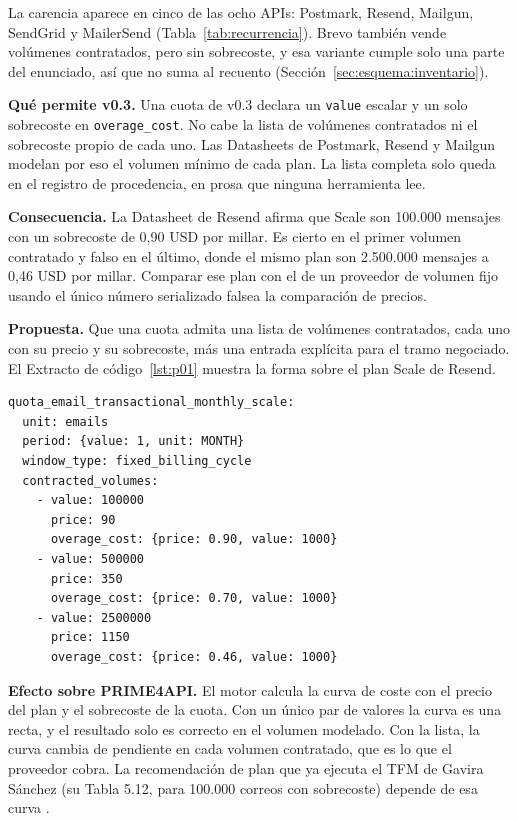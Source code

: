 La carencia aparece en cinco de las ocho APIs: Postmark, Resend, Mailgun, SendGrid y MailerSend (Tabla~\ref{tab:recurrencia}).
Brevo también vende volúmenes contratados, pero sin sobrecoste, y esa variante cumple solo una parte del enunciado, así que no suma al recuento (Sección~\ref{sec:esquema:inventario}).

\textbf{Qué permite v0.3.} Una cuota de v0.3 declara un \texttt{value} escalar y un solo sobrecoste en \texttt{overage\_cost}.
No cabe la lista de volúmenes contratados ni el sobrecoste propio de cada uno.
Las Datasheets de Postmark, Resend y Mailgun modelan por eso el volumen mínimo de cada plan.
La lista completa solo queda en el registro de procedencia, en prosa que ninguna herramienta lee.

\textbf{Consecuencia.} La Datasheet de Resend afirma que Scale son 100.000 mensajes con un sobrecoste de 0,90 USD por millar.
Es cierto en el primer volumen contratado y falso en el último, donde el mismo plan son 2.500.000 mensajes a 0,46 USD por millar.
Comparar ese plan con el de un proveedor de volumen fijo usando el único número serializado falsea la comparación de precios.

\textbf{Propuesta.} Que una cuota admita una lista de volúmenes contratados, cada uno con su precio y su sobrecoste, más una entrada explícita para el tramo negociado.
El Extracto de código~\ref{lst:p01} muestra la forma sobre el plan Scale de Resend.

\begin{lstlisting}[style=datasheetyaml,caption={P-01: volúmenes contratados dentro de un plan, con precio y sobrecoste propios (caso Resend, plan Scale, tres de los seis volúmenes).},label={lst:p01}]
quota_email_transactional_monthly_scale:
  unit: emails
  period: {value: 1, unit: MONTH}
  window_type: fixed_billing_cycle
  contracted_volumes:
    - value: 100000
      price: 90
      overage_cost: {price: 0.90, value: 1000}
    - value: 500000
      price: 350
      overage_cost: {price: 0.70, value: 1000}
    - value: 2500000
      price: 1150
      overage_cost: {price: 0.46, value: 1000}
\end{lstlisting}

\textbf{Efecto sobre PRIME4API.} El motor calcula la curva de coste con el precio del plan y el sobrecoste de la cuota.
Con un único par de valores la curva es una recta, y el resultado solo es correcto en el volumen modelado.
Con la lista, la curva cambia de pendiente en cada volumen contratado, que es lo que el proveedor cobra.
La recomendación de plan que ya ejecuta el TFM de Gavira Sánchez (su Tabla 5.12, para 100.000 correos con sobrecoste) depende de esa curva \citep{gavira2026tfm}.


